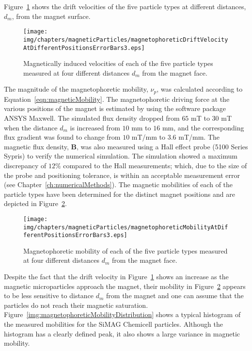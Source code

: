 Figure~\ref{fig:magnetophoreticDriftVelocityAtDifferentPositions} shows the drift velocities of the five particle types at different distances, $d_{m}$, from the magnet surface.

\begin{figure}[htb]
   \centering
   \texttt{[image: img/chapters/magneticParticles/magnetophoreticDriftVelocityAtDifferentPositionsErrorBars3.eps]}
   \caption[Magnetically induced velocities of different particle types]{Magnetically induced velocities of each of the five particle types measured at four different distances $d_{m}$ from the magnet face.}
   \label{fig:magnetophoreticDriftVelocityAtDifferentPositions}
\end{figure}

The magnitude of the magnetophoretic mobility, $\nu_{p}$, was calculated according to Equation~\ref{eqn:magneticMobility}. The magnetophoretic driving force at the various positions of the magnet is estimated by using the software package ANSYS Maxwell. The simulated flux density dropped from $65$ mT to $30$ mT when the distance $d_{m}$ is increased from $10$ mm to $16$ mm, and the corresponding flux gradient was found to change from $10$ mT/mm to $3.6$ mT/mm. The magnetic flux density, $\mathbf{B}$, was also measured using a Hall effect probe (5100 Series Sypris) to verify the numerical simulation. The simulation showed a maximum discrepancy of $12\%$ compared to the Hall measurements; which, due to the size of the probe and positioning tolerance, is within an acceptable measurement error (see Chapter~\ref{ch:numericalMethods}). The magnetic mobilities of each of the particle types have been determined for the distinct magnet positions and are depicted in Figure~\ref{fig:magnetophoreticMobilityAtDifferentPositions}.

\begin{figure}[htb]
   \centering
   \texttt{[image: img/chapters/magneticParticles/magnetophoreticMobilityAtDifferentPositionsErrorBars3.eps]}
   \caption[Magnetophoretic mobility of different particle types]{Magnetophoretic mobility of each of the five particle types measured at four different distances $d_{m}$ from the magnet face.}
   \label{fig:magnetophoreticMobilityAtDifferentPositions}
\end{figure}

Despite the fact that the drift velocity in Figure~\ref{fig:magnetophoreticDriftVelocityAtDifferentPositions} shows an increase as the magnetic microparticles approach the magnet, their mobility in Figure~\ref{fig:magnetophoreticMobilityAtDifferentPositions} appears to be less sensitive to distance $d_{m}$ from the magnet and one can assume that the particles do not reach their magnetic saturation. Figure~\ref{img:magnetophoreticMobilityDistribution} shows a typical histogram of the measured mobilities for the SiMAG Chemicell particles. Although the histogram has a clearly defined peak, it also shows a large variance in magnetic mobility.

